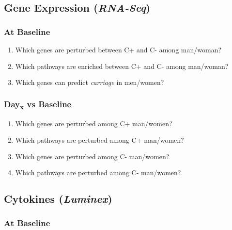 \documentclass[
]{book}
\providecommand{\tightlist}{%
  \setlength{\itemsep}{0pt}\setlength{\parskip}{0pt}}
\begin{document}
\hypertarget{gene-expression-rna-seq}{%
\subsection{\texorpdfstring{Gene Expression (\emph{RNA-Seq})}{Gene Expression (RNA-Seq)}}\label{gene-expression-rna-seq}}

\hypertarget{at-baseline}{%
\subsubsection{At Baseline}\label{at-baseline}}

\begin{enumerate}
\def\labelenumi{\arabic{enumi}.}
\tightlist
\item
  Which genes are perturbed between C+ and C- among man/woman?
\item
  Which pathways are enriched between C+ and C- among man/woman?
\item
  Which genes can predict \emph{carriage} in men/women?
\end{enumerate}

\hypertarget{dayx-vs-baseline}{%
\subsubsection{\texorpdfstring{Day\textsubscript{x} vs Baseline}{Dayx vs Baseline}}\label{dayx-vs-baseline}}

\begin{enumerate}
\def\labelenumi{\arabic{enumi}.}
\tightlist
\item
  Which genes are perturbed among C+ man/women?
\item
  Which pathways are perturbed among C+ man/women?
\item
  Which genes are perturbed among C- man/women?
\item
  Which pathways are perturbed among C- man/women?
\end{enumerate}

\hypertarget{cytokines-luminex}{%
\subsection{\texorpdfstring{Cytokines (\emph{Luminex})}{Cytokines (Luminex)}}\label{cytokines-luminex}}

\hypertarget{at-baseline-1}{%
\subsubsection{At Baseline}\label{at-baseline-1}}
\end{document}
